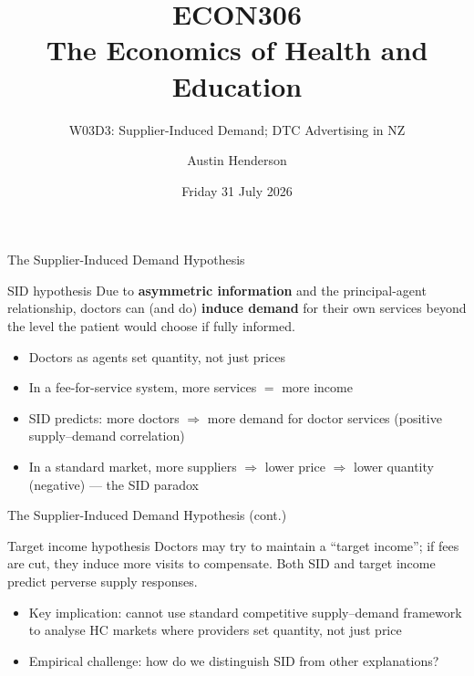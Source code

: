 \documentclass[aspectratio=169, 12pt]{beamer}
\title[ECON306: W03D3 — SID \& DTC Advertising]{ECON306\\The Economics of Health and Education}
\subtitle{W03D3: Supplier-Induced Demand; DTC Advertising in NZ}
\author{Austin Henderson}
\institute{Department of Economics\\University of Otago}
\date{Friday 31 July 2026}
\begin{document}
\begin{frame}[plain]
  \titlepage
\end{frame}



\begin{frame}{The Supplier-Induced Demand Hypothesis}
  \begin{block}{SID hypothesis}
    Due to \textbf{asymmetric information} and the principal-agent relationship, doctors can
    (and do) \textbf{induce demand} for their own services beyond the level the patient would
    choose if fully informed.
  \end{block}
  \begin{itemize}
    \item Doctors as agents set quantity, not just prices
    \item In a fee-for-service system, more services $=$ more income
    \item SID predicts: more doctors $\Rightarrow$ more demand for doctor services
          (positive supply--demand correlation)
    \item In a standard market, more suppliers $\Rightarrow$ lower price $\Rightarrow$
          lower quantity (negative) --- the SID paradox
  \end{itemize}
\end{frame}

\begin{frame}{The Supplier-Induced Demand Hypothesis (cont.)}
  \begin{alertblock}{Target income hypothesis}
    Doctors may try to maintain a ``target income''; if fees are cut, they induce more
    visits to compensate. Both SID and target income predict perverse supply responses.
  \end{alertblock}
  \begin{itemize}
    \item Key implication: cannot use standard competitive supply--demand framework to
          analyse HC markets where providers set quantity, not just price
    \item Empirical challenge: how do we distinguish SID from other explanations?
  \end{itemize}
\end{frame}
\end{document}
